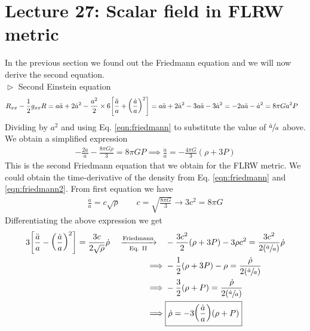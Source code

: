 \section*{Lecture 27: Scalar field in FLRW metric}
In the previous section we found out the Friedmann equation and we will now derive the second equation. \\[0.2cm]
$\vartriangleright$ Second Einstein equation 
\begin{align*}
    R_{xx} - \frac{1}{2}g_{xx} R &= a\ddot{a} + 2\dot{a}^2 - \frac{a^2}{2}\times 6\qty[\frac{\ddot{a}}{a}+\qty(\frac{\dot{a}}{a})^2]=a\ddot{a}+2\dot{a}^2 - 3a\ddot{a} - 3\dot{a}^2=-2a\ddot{a} -\dot{a}^2 = 8\pi G a^2P
\end{align*}
Dividing by $a^2$ and using Eq. \ref{eqn:friedmann} to substitute the value of $\sfrac{\dot{a}}{a}$ above. We obtain a simplified expression 
\begin{align}\label{eqn:friedmann2}
    -\frac{2\ddot{a}}{{a}} - \frac{8\pi G \rho}{3}  = 8\pi G P \implies \boxed{\frac{\ddot{a}}{{a}}  = -\frac{4\pi G}{3}(\rho+3P)}
\end{align}
This is the second Friedmann equation that we obtain for the FLRW metric. We could obtain the time-derivative of the density from Eq. \ref{eqn:friedmann} and \ref{eqn:friedmann2}. From first equation we have 
\begin{align*}
    \frac{\dot{a}}{a} = c \sqrt{\rho} \qquad c = \sqrt{\frac{8\pi G}{3}} \rightarrow 3c^2 = 8\pi G
\end{align*}
Differentiating the above expression we get 
\begin{align}\label{eqn:rhodot}
    \begin{split}
        3\qty[\frac{\ddot{a}}{a} - \qty(\frac{\dot{a}}{a})^2] = \frac{3c}{2\sqrt{\rho}}\dot{\rho}\quad  \xrightarrow[\text{Eq. II}]{\text{Friedmann}} \quad  &-\frac{3c^2}{2}(\rho+3P) - 3\rho c^2 = \frac{3c^2}{2\qty(\sfrac{\dot{a}}{a})}\dot{\rho}\\
    \implies& -\frac{1}{2}(\rho + 3P) - \rho = \frac{\dot{\rho}}{2\qty(\sfrac{\dot{a}}{a})}\\
    \implies& -\frac{3}{2}(\rho + P) = \frac{\dot{\rho}}{2\qty(\sfrac{\dot{a}}{a})}\\
    \implies&\boxed{\dot{\rho} = -3\qty(\frac{\dot{a}}{a})(\rho+P)}
    \end{split}
\end{align}
